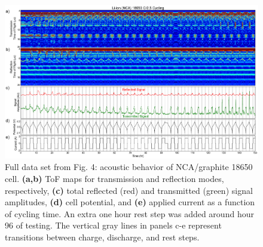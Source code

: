 \begin{figure}[htb]
  \centering
    \includegraphics[width=\textwidth]{ch-appendices/images/ncafull.png}
    \caption[Full data set from Fig. 4: acoustic behavior of NCA/graphite 18650 cell.]{Full data set from Fig. 4: acoustic behavior of NCA/graphite 18650 cell. \textbf{(a,b)} ToF maps for transmission and reflection modes, respectively, \textbf{(c)} total reflected (red) and transmitted (green) signal amplitudes, \textbf{(d)} cell potential, and \textbf{(e)} applied current as a function of cycling time. An extra one hour rest step was added around hour 96 of testing. The vertical gray lines in panels c-e represent transitions between charge, discharge, and rest steps.}
    \label{fig:ncafull}
\end{figure}  